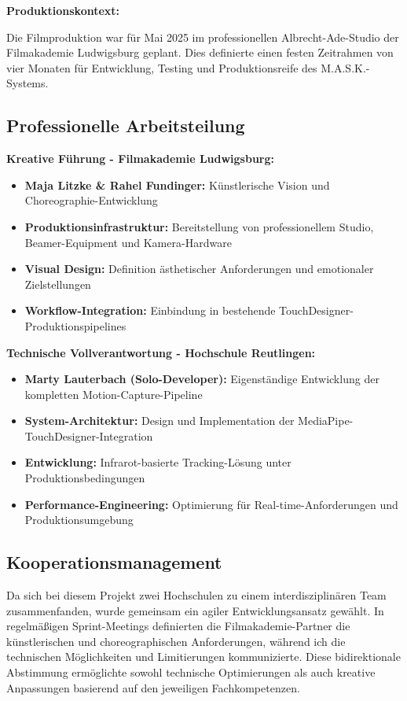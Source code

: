 \textbf{Produktionskontext:}

Die Filmproduktion war für Mai 2025 im professionellen Albrecht-Ade-Studio der Filmakademie Ludwigsburg geplant. Dies definierte einen festen Zeitrahmen von vier Monaten für Entwicklung, Testing und Produktionsreife des M.A.S.K.-Systems.

\newpage

\subsection{Professionelle Arbeitsteilung}

\textbf{Kreative Führung - Filmakademie Ludwigsburg:}
\begin{itemize}
    \item \textbf{Maja Litzke \& Rahel Fundinger:} Künstlerische Vision und Choreographie-Entwicklung
    \item \textbf{Produktionsinfrastruktur:} Bereitstellung von professionellem Studio, Beamer-Equipment und Kamera-Hardware
    \item \textbf{Visual Design:} Definition ästhetischer Anforderungen und emotionaler Zielstellungen
    \item \textbf{Workflow-Integration:} Einbindung in bestehende TouchDesigner-Produktionspipelines
\end{itemize}

\textbf{Technische Vollverantwortung - Hochschule Reutlingen:}
\begin{itemize}
    \item \textbf{Marty Lauterbach (Solo-Developer):} Eigenständige Entwicklung der kompletten Motion-Capture-Pipeline
    \item \textbf{System-Architektur:} Design und Implementation der MediaPipe-TouchDesigner-Integration
    \item \textbf{Entwicklung:} Infrarot-basierte Tracking-Lösung unter Produktionsbedingungen
    \item \textbf{Performance-Engineering:} Optimierung für Real-time-Anforderungen und Produktionsumgebung
\end{itemize}

\subsection{Kooperationsmanagement}

Da sich bei diesem Projekt zwei Hochschulen zu einem interdisziplinären Team zusammenfanden, wurde gemeinsam ein agiler Entwicklungsansatz gewählt. In regelmäßigen Sprint-Meetings definierten die Filmakademie-Partner die künstlerischen und choreographischen Anforderungen, während ich die technischen Möglichkeiten und Limitierungen kommunizierte. Diese bidirektionale Abstimmung ermöglichte sowohl technische Optimierungen als auch kreative Anpassungen basierend auf den jeweiligen Fachkompetenzen.

